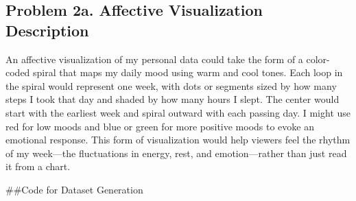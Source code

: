 \documentclass[
]{article}
\begin{document}
\subsection{Problem 2a. Affective Visualization
Description}\label{problem-2a.-affective-visualization-description}

An affective visualization of my personal data could take the form of a
color-coded spiral that maps my daily mood using warm and cool tones.
Each loop in the spiral would represent one week, with dots or segments
sized by how many steps I took that day and shaded by how many hours I
slept. The center would start with the earliest week and spiral outward
with each passing day. I might use red for low moods and blue or green
for more positive moods to evoke an emotional response. This form of
visualization would help viewers feel the rhythm of my week---the
fluctuations in energy, rest, and emotion---rather than just read it
from a chart.

\#\#Code for Dataset Generation
\end{document}

